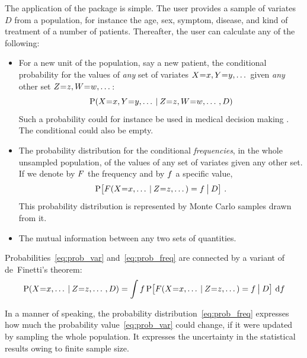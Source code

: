 \documentclass{article}
\begin{document}
The application of the package is simple. The user provides a sample of variates $D$ from a population, for instance the age, sex, symptom, disease, and kind of treatment of a number of patients. Thereafter, the user can calculate any of the following:
\begin{itemize}
\item For a new unit of the population, say a new patient, the conditional probability for the values of \emph{any} set of variates $X \mo x, Y \mo y, \dotso$ given \emph{any} other set $Z \mo z, W \mo w, \dotso$:
  \begin{equation}\label{eq:prob_var}
    \P(X \mo x, Y \mo y, \dotso \|Z \mo z, W \mo w, \dotso , D)
  \end{equation}
  Such a probability could for instance be used in medical decision making \citep{soxetal1988_r2024,huninketal2001_r2014}. The conditional could also be empty.

\item The probability distribution for the conditional \emph{frequencies}, in the whole unsampled population, of the values of any set of variates given any other set. If we denote by $F$ the frequency and by $f$ a specific value,
  \begin{equation}\label{eq:prob_freq}
    \P\bigl[ \yF(X \mo x, \dotso \|Z \mo z, \dotso) = \yf \|[\big] D\bigr]
    \ .
  \end{equation}
This probability distribution is represented by Monte Carlo samples drawn from it.

\item The mutual information \citep[Ch.~8]{mackay1995_r2005} between any two sets of quantities.
\end{itemize}

Probabilities~\eqref{eq:prob_var} and~\eqref{eq:prob_freq} are connected by a variant of de~Finetti's theorem:
\begin{equation}
  \label{eq:definetti1}
  \P(X \mo x, \dotso \|Z \mo z, \dotso , D)  =
  \int \yf \,
  \P\bigl[ \yF(X \mo x, \dotso \|Z \mo z, \dotso) = \yf \|[\big] D\bigr]
  \,\di\yf
\end{equation}

In a manner of speaking, the probability distribution~\eqref{eq:prob_freq} expresses how much the probability value~\eqref{eq:prob_var} could change, if it were updated by sampling the whole population. It expresses the uncertainty in the statistical results owing to finite sample size.
\end{document}
